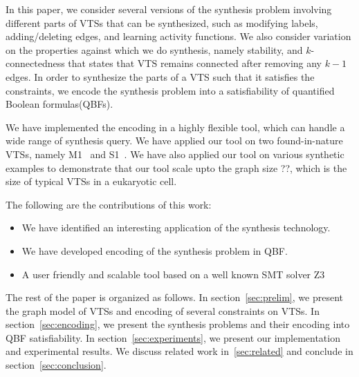 In this paper, we consider several versions of the synthesis problem
involving different parts of VTSs that can be synthesized, such as
modifying labels, adding/deleting edges, and learning activity functions.
%
We also consider variation on the properties against which we do synthesis,
namely stability, and $k$-connectedness that states
that VTS remains connected after removing any $k-1$ edges.
%
In order to synthesize the parts of a VTS such that it satisfies the
constraints, we encode the synthesis problem into a satisfiability of
quantified Boolean formulas(QBFs). 
%

We have implemented the encoding in a highly flexible tool,
which can handle a wide range of synthesis query.
%
We have applied our tool on two found-in-nature VTSs, namely
M1~\cite{} and S1~\cite{}.
%
We have also applied our tool on various synthetic examples to
demonstrate that our tool scale upto the graph size ??, which
is the size of typical VTSs in a eukaryotic cell.

The following are the contributions of this work:
\begin{itemize}
\item We have identified an interesting application of
  the synthesis technology.
\item We have developed encoding of the synthesis problem in QBF.
\item A user friendly and scalable tool based on a well known SMT solver Z3
\end{itemize}

The rest of the paper is organized as follows.
%
In section~\ref{sec:prelim}, we present the graph model of VTSs and encoding of several
constraints on VTSs.
%
In section~\ref{sec:encoding}, we present the synthesis problems and their
encoding into QBF satisfiability.
%
In section~\ref{sec:experiments}, we present our implementation and experimental results.
%
We discuss related work in~\ref{sec:related} and conclude in section~\ref{sec:conclusion}.



